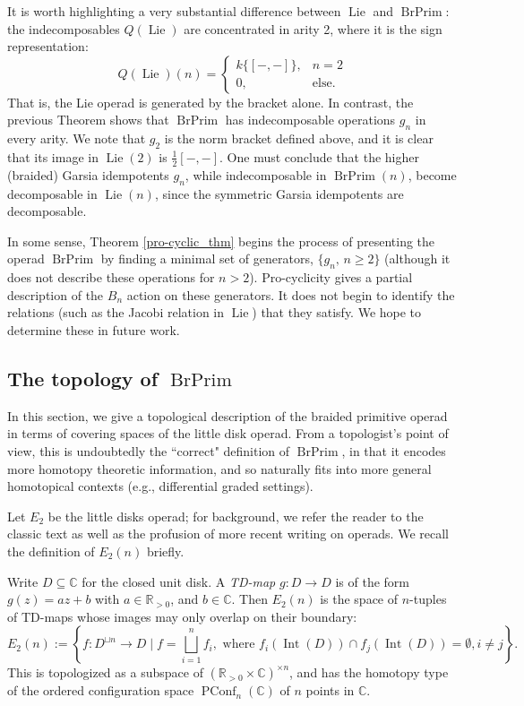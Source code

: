 \documentclass[12pt]{article}
\DeclareMathOperator{\Int}{Int}
\DeclareMathOperator{\PConf}{PConf}
\DeclareMathOperator{\Lie}{Lie}
\DeclareMathOperator{\BrPrim}{BrPrim}
\newcommand{\field}[1]{\mathbb{#1}}
\newcommand{\R}{\field{R}}
\newcommand{\C}{\field{C}}
\theoremstyle{plain}
\theoremstyle{definition}
\theoremstyle{remark}
\begin{document}
It is worth highlighting a very substantial difference between $\Lie$ and $\BrPrim$: the indecomposables $Q(\Lie)$ are concentrated in arity 2, where it is the sign representation:
%
$$Q(\Lie)(n) = \left\{\begin{array}{ll} k\{[-,-]\}, & n=2 \\ 0, & \mbox{else.} \end{array} \right.$$
%
That is, the Lie operad is generated by the bracket alone.  In contrast, the previous Theorem shows that $\BrPrim$ has indecomposable operations $g_n$ in every arity.  We note that $g_2$ is the norm bracket defined above, and it is clear that its image in $\Lie(2)$ is $\frac{1}{2}[-,-]$.  One must conclude that the higher (braided) Garsia idempotents $g_n$, while indecomposable in $\BrPrim(n)$, become decomposable in $\Lie(n)$, since the symmetric Garsia idempotents are decomposable.

In some sense, Theorem \ref{pro-cyclic_thm} begins the process of presenting the operad $\BrPrim$ by finding a minimal set of generators, $\{g_n, \, n\geq 2\}$ (although it does not describe these operations for $n>2$).  Pro-cyclicity gives a partial description of the $B_n$ action on these generators.  It does not begin to identify the relations (such as the Jacobi relation in $\Lie$) that they satisfy.  We hope to determine these in future work. 

\subsection{The topology of $\BrPrim$} \label{topology_section}

In this section, we give a topological description of the braided primitive operad in terms of covering spaces of the little disk operad.  From a topologist's point of view, this is undoubtedly the ``correct" definition of $\BrPrim$, in that it encodes more homotopy theoretic information, and so naturally fits into more general homotopical contexts (e.g., differential graded settings).  

Let $E_2$ be the little disks operad; for background, we refer the reader to the classic text \cite{may} as well as the profusion of more recent writing on operads.  We recall the definition of $E_2(n)$ briefly.  

Write $D \subseteq \C$ for the closed unit disk.  A \emph{TD-map} $g:D \to D$ is of the form $g(z) = a z + b$ with $a \in \R_{>0}$, and $b \in \C$.  Then $E_2(n)$ is the space of $n$-tuples of TD-maps whose images may only overlap on their boundary: 
%
$$E_2(n):=\left\{f: D^{\sqcup n} \to D \; | \; f=\bigsqcup_{i=1}^n f_i, \mbox{ where }  f_i(\Int(D)) \cap f_j(\Int(D)) = \emptyset, i \neq j \right\}.$$
%
This is topologized as a subspace of $(\R_{>0} \times \C)^{\times n}$, and has the homotopy type of the ordered configuration space $\PConf_n(\C)$ of $n$ points in $\C$.
\end{document}
